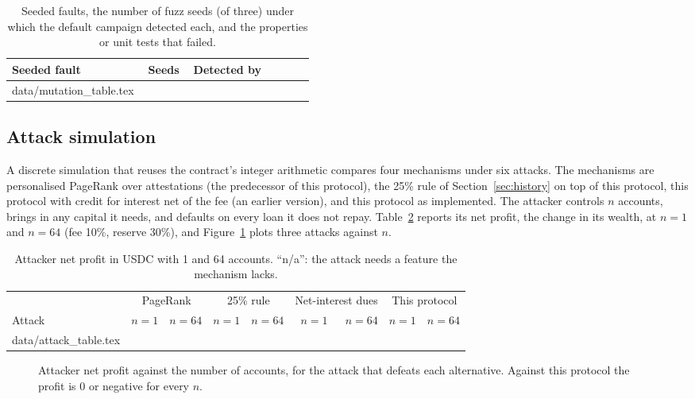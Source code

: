 \documentclass[acmsmall,nonacm,screen]{acmart}
\makeatletter
\theoremstyle{acmdefinition}%
\newcommand{\inputrows}[1]{\@@input #1 }
\makeatother
\begin{document}
\begin{table}[t]
  \caption{Seeded faults, the number of fuzz seeds (of three) under which the default campaign
  detected each, and the properties or unit tests that failed.}
  \label{tab:mutation}
  \centering\small
  \begin{tabular}{p{0.44\linewidth}cp{0.4\linewidth}}
    \toprule
    Seeded fault & Seeds & Detected by \\
    \midrule
    \inputrows{data/mutation_table.tex}
    \bottomrule
  \end{tabular}
\end{table}

\subsection{Attack simulation}\label{sec:sim}

A discrete simulation that reuses the contract's integer arithmetic compares four mechanisms under
six attacks. The mechanisms are personalised PageRank over attestations (the predecessor of this
protocol), the 25\% rule of Section~\ref{sec:history} on top of this protocol, this protocol with
credit for interest net of the fee (an earlier version), and this protocol as implemented. The
attacker controls $n$ accounts, brings in any capital it needs, and defaults on every loan it does
not repay. Table~\ref{tab:sim} reports its net profit, the change in its wealth, at $n=1$ and $n=64$
(fee 10\%, reserve 30\%), and Figure~\ref{fig:profit} plots three attacks against $n$.

\begin{table}[t]
  \caption{Attacker net profit in USDC with 1 and 64 accounts. ``n/a'': the attack needs a feature
  the mechanism lacks.}
  \label{tab:sim}
  \centering\footnotesize
  \setlength{\tabcolsep}{3.5pt}
  \begin{tabular}{lrrrrrrrr}
    \toprule
    & \multicolumn{2}{c}{PageRank} & \multicolumn{2}{c}{25\% rule} & \multicolumn{2}{c}{Net-interest dues} & \multicolumn{2}{c}{This protocol} \\
    \cmidrule(lr){2-3}\cmidrule(lr){4-5}\cmidrule(lr){6-7}\cmidrule(lr){8-9}
    Attack & $n=1$ & $n=64$ & $n=1$ & $n=64$ & $n=1$ & $n=64$ & $n=1$ & $n=64$ \\
    \midrule
    \inputrows{data/attack_table.tex}
    \bottomrule
  \end{tabular}
\end{table}

\begin{figure}[t]
  \centering
  
  \caption{Attacker net profit against the number of accounts, for the attack that defeats each
  alternative. Against this protocol the profit is $0$ or negative for every $n$.}
  \label{fig:profit}
\end{figure}
\end{document}
